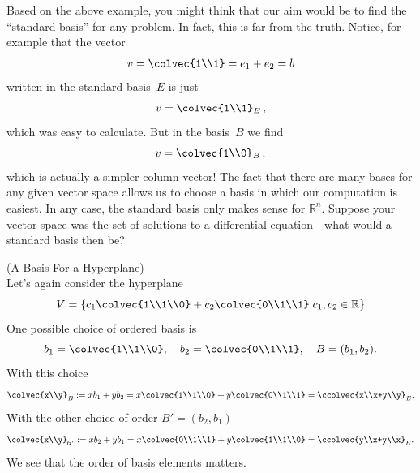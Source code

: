\begin{example}

\end{example}

Based on the above example, you might think that our aim would be to find the ``standard basis'' for any problem. 
In fact, this is far from the truth. Notice, for example that the vector \[v=\colvec{1\\1}=e_1+e_2=b\] written in the standard basis~$E$ is just
\[
v=\colvec{1\\1}_E\, ,
\]
which was easy to calculate. But in the basis~$B$ we find
\[
v=\colvec{1\\0}_B\, ,
\]
which is actually a simpler column vector!
The fact that there are many bases for any given vector space allows us to choose a basis in which our computation is easiest. 
In any case, the standard basis only makes sense for $\mathbb{R}^n$. Suppose your vector space was the set of solutions to a differential equation---what would a standard basis then be?



\begin{example} (A Basis For a Hyperplane)\\
Let's again consider the hyperplane
\[
V=\left\{  c_1\colvec{1\\1\\0} +c_2\colvec{0\\1\\1} \middle| c_1,c_2\in \mathbb{R} \right\} 
\]
One possible choice of ordered basis is 
\[b_1=\colvec{1\\1\\0},~~~b_2=\colvec{0\\1\\1}, ~~~
B=(b_1,b_2).
\]
With this choice
\[
\colvec{x\\y}_B := xb_1+ y b_2 
=x\colvec{1\\1\\0}+y \colvec{0\\1\\1}=\ccolvec{x\\x+y\\y}_E.
\]
With the other choice of order $B'=(b_2, b_1)$ 
\[
\colvec{x\\y}_{\!B'} := xb_2+ y b_1 
=x\colvec{0\\1\\1}+y \colvec{1\\1\\0}=\ccolvec{y\\x+y\\x}_E.
\]
We see that the  order of basis elements matters. 
\end{example}

